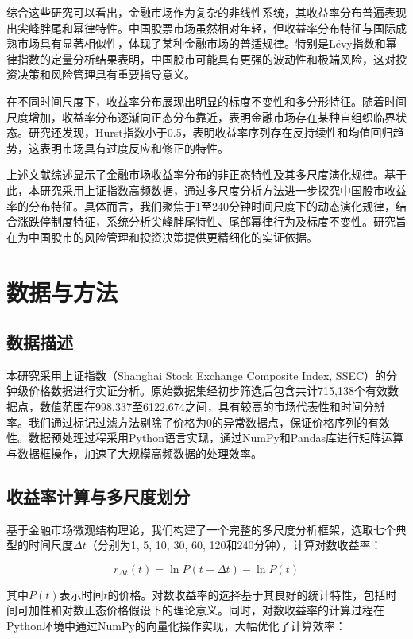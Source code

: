 \documentclass[12pt, a4paper]{article}
\begin{document}
综合这些研究可以看出，金融市场作为复杂的非线性系统，其收益率分布普遍表现出尖峰胖尾和幂律特性。中国股票市场虽然相对年轻，但收益率分布特征与国际成熟市场具有显著相似性，体现了某种金融市场的普适规律。特别是Lévy指数和幂律指数的定量分析结果表明，中国股市可能具有更强的波动性和极端风险，这对投资决策和风险管理具有重要指导意义。

在不同时间尺度下，收益率分布展现出明显的标度不变性和多分形特征。随着时间尺度增加，收益率分布逐渐向正态分布靠近，表明金融市场存在某种自组织临界状态。研究还发现，Hurst指数小于0.5，表明收益率序列存在反持续性和均值回归趋势，这表明市场具有过度反应和修正的特性\cite{du2007}。

上述文献综述显示了金融市场收益率分布的非正态特性及其多尺度演化规律。基于此，本研究采用上证指数高频数据，通过多尺度分析方法进一步探究中国股市收益率的分布特征。具体而言，我们聚焦于1至240分钟时间尺度下的动态演化规律，结合涨跌停制度特征，系统分析尖峰胖尾特性、尾部幂律行为及标度不变性。研究旨在为中国股市的风险管理和投资决策提供更精细化的实证依据。

\section{数据与方法}

\subsection{数据描述}

本研究采用上证指数（Shanghai Stock Exchange Composite Index, SSEC）的分钟级价格数据进行实证分析。原始数据集经初步筛选后包含共计715,138个有效数据点，数值范围在998.337至6122.674之间，具有较高的市场代表性和时间分辨率。我们通过标记过滤方法剔除了价格为0的异常数据点，保证价格序列的有效性。数据预处理过程采用Python语言实现，通过NumPy和Pandas库进行矩阵运算与数据框操作，加速了大规模高频数据的处理效率。

\subsection{收益率计算与多尺度划分}

基于金融市场微观结构理论，我们构建了一个完整的多尺度分析框架，选取七个典型的时间尺度$\Delta t$（分别为1, 5, 10, 30, 60, 120和240分钟），计算对数收益率：

\begin{equation}
r_{\Delta t}(t) = \ln P(t+\Delta t) - \ln P(t)
\end{equation}

其中$P(t)$表示时间$t$的价格。对数收益率的选择基于其良好的统计特性，包括时间可加性和对数正态价格假设下的理论意义。同时，对数收益率的计算过程在Python环境中通过NumPy的向量化操作实现，大幅优化了计算效率：
\end{document}
